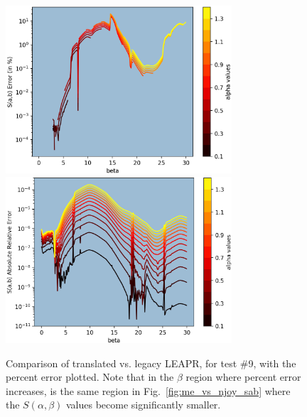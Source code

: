 \documentclass[Master.tex]{subfiles}
\begin{document}
    \begin{figure}[H]
      \begin{center}
        \includegraphics[width=0.75\textwidth]{images/me-vs-njoy-3c}
        \includegraphics[width=0.75\textwidth]{images/me-vs-njoy-4c}
        \caption[Comparison of Translated vs. Legacy LEAPR, for Test \#9 (\% Error) ]{Comparison of translated vs. legacy LEAPR, for test \#9, with the percent error plotted. Note that in the $\beta$ region where percent error increases, is the same region in Fig.~\ref{fig:me_vs_njoy_sab} where the $S(\alpha,\beta)$ values become significantly smaller.}
        \label{fig:me_vs_njoy_error}
      \end{center}
    \end{figure}
\end{document}
